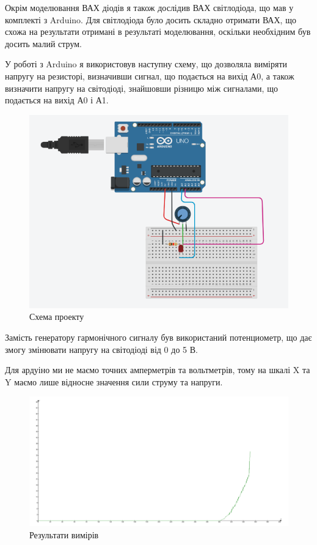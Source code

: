 \qquad Окрім моделювання ВАХ діодів я також дослідив ВАХ світлодіода, що мав у комплекті з Arduino. Для світлодіода було досить складно отримати ВАХ, що схожа на результати отримані в результаті моделювання, оскільки необхідним був досить малий струм.

У роботі з Arduino я використовув наступну схему, що дозволяла виміряти напругу на резисторі, визначивши сигнал, що подається на вихід А0, а також визначити напругу на світодіоді, знайшовши різницю між сигналами, що подається на вихід А0 і А1.
\begin{figure}[ht]

\centering

\includegraphics[width=0.6\linewidth]{АрдуиноСхема.png}

\caption{Схема проекту}

\label{ArduinoShema}

\end{figure}

Замість генератору гармонічного сигналу був використаний потенциометр, що дає змогу змінювати напругу на світодіоді від 0 до 5 В.


Для ардуіно ми не маємо точних амперметрів та вольтметрів, тому на шкалі X та Y маємо лише відносне значення сили струму та напруги.
\begin{figure}[ht]

\centering

\includegraphics[width=0.8\linewidth]{Ардуино1.png}

\caption{Результати вимірів}

\label{Arduino1Rez}

\end{figure}
